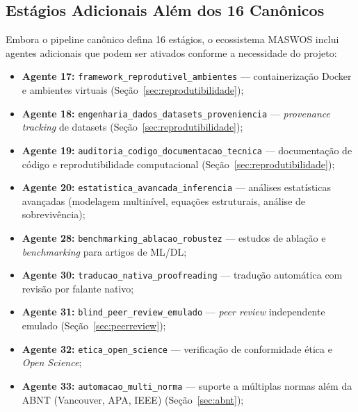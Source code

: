 \subsection{Estágios Adicionais Além dos 16 Canônicos}
\label{sec:estagios_extras}

Embora o pipeline canônico defina 16 estágios, o ecossistema
MASWOS inclui agentes adicionais que podem ser ativados conforme a
necessidade do projeto:

\begin{itemize}
    \item \textbf{Agente 17:} \texttt{framework\_reprodutivel\_ambientes}
    — containerização Docker e ambientes virtuais
    (Seção~\ref{sec:reprodutibilidade});

    \item \textbf{Agente 18:}
    \texttt{engenharia\_dados\_datasets\_proveniencia} —
    \textit{provenance tracking} de datasets
    (Seção~\ref{sec:reprodutibilidade});

    \item \textbf{Agente 19:}
    \texttt{auditoria\_codigo\_documentacao\_tecnica} — documentação
    de código e reprodutibilidade computacional
    (Seção~\ref{sec:reprodutibilidade});

    \item \textbf{Agente 20:}
    \texttt{estatistica\_avancada\_inferencia} — análises
    estatísticas avançadas (modelagem multinível, equações
    estruturais, análise de sobrevivência);

    \item \textbf{Agente 28:}
    \texttt{benchmarking\_ablacao\_robustez} — estudos de ablação e
    \textit{benchmarking} para artigos de ML/DL;

    \item \textbf{Agente 30:}
    \texttt{traducao\_nativa\_proofreading} — tradução automática
    com revisão por falante nativo;

    \item \textbf{Agente 31:}
    \texttt{blind\_peer\_review\_emulado} — \textit{peer review}
    independente emulado
    (Seção~\ref{sec:peerreview});

    \item \textbf{Agente 32:} \texttt{etica\_open\_science} —
    verificação de conformidade ética e \textit{Open Science};

    \item \textbf{Agente 33:} \texttt{automacao\_multi\_norma} —
    suporte a múltiplas normas além da ABNT (Vancouver, APA, IEEE)
    (Seção~\ref{sec:abnt});


\end{itemize}
